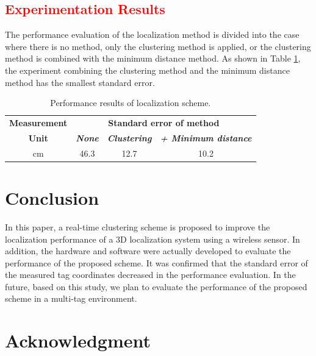 \documentclass[conference]{IEEEtran}
\begin{document}
\subsection{\textcolor{red}{Experimentation Results}}
The performance evaluation of the localization method is divided into the case where there is no method, only the clustering method is applied, or the clustering method is combined with the minimum distance method. As shown in Table \ref{tab1}, the experiment combining the clustering method and the minimum distance method has the smallest standard error.

\begin{table}[htbp]
    \caption{Performance results of localization scheme.}
    \begin{center}
        \begin{tabular}{|c|c|c|c|}
            \hline
            \textbf{Measurement} & \multicolumn{3}{|c|}{\textbf{Standard error of method}}                                                                       \\
            \cline{2-4}
            \textbf{Unit}        & \textbf{\textit{None}}                                  & \textbf{\textit{Clustering}} & \textbf{\textit{+ Minimum distance}} \\
            \hline
            cm                   & 46.3                                                    & 12.7                         & 10.2                                 \\
            \hline
        \end{tabular}
        \label{tab1}
    \end{center}
\end{table}

\section{Conclusion}

In this paper, a real-time clustering scheme is proposed to improve the localization performance of a 3D localization system using a wireless sensor. In addition, the hardware and software were actually developed to evaluate the performance of the proposed scheme. It was confirmed that the standard error of the measured tag coordinates decreased in the performance evaluation. In the future, based on this study, we plan to evaluate the performance of the proposed scheme in a multi-tag environment.

\section*{Acknowledgment}
\end{document}
